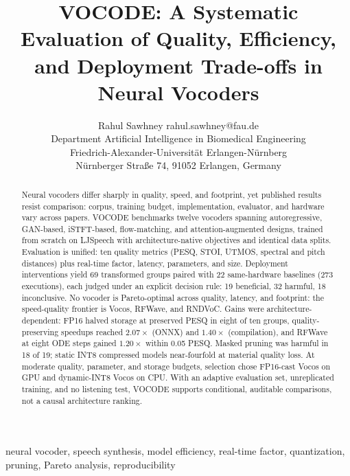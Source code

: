 \documentclass[twoside,11pt]{article}
\begin{document}
\title{VOCODE: A Systematic Evaluation of Quality, Efficiency, and
Deployment Trade-offs in Neural Vocoders}

\author{\name Rahul Sawhney \email rahul.sawhney@fau.de \\
  \addr Department Artificial Intelligence in Biomedical Engineering\\
  Friedrich-Alexander-Universit\"at Erlangen-N\"urnberg\\
  N\"urnberger Stra\ss e 74, 91052 Erlangen, Germany}

\maketitle

\begin{abstract}%
Neural vocoders differ sharply in quality, speed, and footprint, yet
published results resist comparison: corpus, training budget,
implementation, evaluator, and hardware vary across papers.  VOCODE
benchmarks twelve vocoders spanning autoregressive, GAN-based,
iSTFT-based, flow-matching, and attention-augmented designs, trained from
scratch on LJSpeech with architecture-native objectives and identical
data splits.  Evaluation is unified: ten quality metrics (PESQ, STOI,
UTMOS, spectral and pitch distances) plus real-time factor, latency,
parameters, and size.  Deployment interventions yield 69 transformed groups paired with 22
same-hardware baselines (273 executions), each judged under an explicit
decision rule: 19 beneficial, 32 harmful, 18 inconclusive.  No vocoder is Pareto-optimal across quality, latency, and
footprint: the speed-quality frontier is Vocos, RFWave, and RNDVoC.  Gains
were architecture-dependent: FP16 halved storage at preserved PESQ in
eight of ten groups, quality-preserving speedups reached $2.07\times$
(ONNX) and $1.40\times$ (compilation), and RFWave at eight ODE steps
gained
$1.20\times$ within 0.05 PESQ.  Masked pruning was harmful in 18 of 19;
static INT8 compressed models near-fourfold at material quality loss.  At
moderate quality, parameter, and storage budgets, selection chose
FP16-cast Vocos on GPU and dynamic-INT8 Vocos on CPU.  With an adaptive
evaluation set, unreplicated training, and no listening test, VOCODE
supports conditional, auditable comparisons, not a causal architecture
ranking.
\end{abstract}

\begin{keywords}
neural vocoder, speech synthesis, model efficiency, real-time factor,
quantization, pruning, Pareto analysis, reproducibility
\end{keywords}








{\footnotesize
\setlength{\bibsep}{0pt}

}
\end{document}
